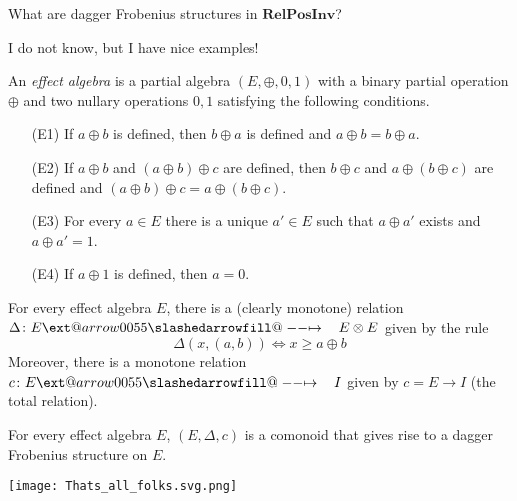 \documentclass{beamer}
\makeatletter
\newcommand{\RelPosInv}{\mathbf{RelPosInv}}
\def\slashedarrowfill@#1#2#3#4#5{%
  $\m@th\thickmuskip0mu\medmuskip\thickmuskip\thinmuskip\thickmuskip
  \relax#5#1\mkern-7mu%
  \cleaders\hbox{$#5\mkern-2mu#2\mkern-2mu$}\hfill
  \mathclap{#3}\mathclap{#2}%
  \cleaders\hbox{$#5\mkern-2mu#2\mkern-2mu$}\hfill
  \mkern-7mu#4$%
}
\def\rightslashedarrowfill@{%
  \slashedarrowfill@\relbar\relbar\mapstochar\rightarrow}
\newcommand\xslashedrightarrow[2][]{%
  \ext@arrow 0055{\rightslashedarrowfill@}{#1}{#2}}
\newcommand{\sto}{\xslashedrightarrow{\hskip 1pc}}
\makeatother
\begin{document}
\begin{frame}
\begin{problem}
What are dagger Frobenius structures in $\RelPosInv$?
\end{problem}
I do not know, but I have nice examples!
\end{frame}

\begin{frame}
An {\em effect algebra} 
is a partial algebra $(E,\oplus,0,1)$ with a binary 
partial operation $\oplus$ and two nullary operations $0,1$ satisfying
the following conditions.
\begin{enumerate}
\item[(E1)]If $a\oplus b$ is defined, then $b\oplus a$ is defined and
		$a\oplus b=b\oplus a$.
\item[(E2)]If $a\oplus b$ and $(a\oplus b)\oplus c$ are defined, then
		$b\oplus c$ and $a\oplus(b\oplus c)$ are defined and
		$(a\oplus b)\oplus c=a\oplus(b\oplus c)$.
\item[(E3)]For every $a\in E$ there is a unique $a'\in E$ such that
		$a\oplus a'$ exists and $a\oplus a'=1$.
\item[(E4)]If $a\oplus 1$ is defined, then $a=0$.
\end{enumerate}
\end{frame}

\begin{frame}
For every effect algebra $E$, there is a (clearly monotone) relation
$\Delta\colon E\sto E\otimes E$ given by the rule
$$
\Delta(x,(a,b))\Leftrightarrow x\geq a\oplus b
$$ Moreover, there is a monotone relation $c\colon E\sto I$ given by 
$c=E\to I$ (the total relation).
\end{frame}
\begin{frame}
\begin{theorem}[GJ]
For every effect algebra $E$, $(E,\Delta,c)$ is a comonoid that
gives rise to a dagger Frobenius structure on $E$.
\end{theorem}

\end{frame}
\begin{frame}
\begin{center}
\texttt{[image: Thats\_all\_folks.svg.png]}
\end{center}

\end{frame}
\end{document}
